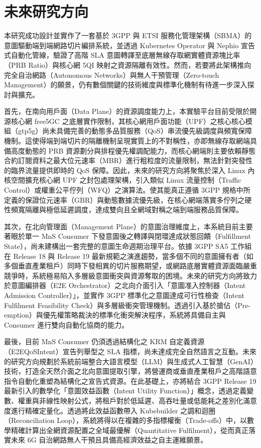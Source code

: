 \chapter{未來研究方向}
\label{sec:future_work}

本研究成功設計並實作了一套基於 3GPP 與 ETSI 服務化管理架構（SBMA）的意圖驅動端到端網路切片編排系統，並透過 Kubernetes Operator 與 Nephio 宣告式自動化管線，驗證了高階 SLA 意圖轉譯至底層無線存取網實體資源塊比率（PRB Ratio）與核心網 5QI 映射之資源隔離有效性。然而，若要將此架構推向完全自治網路（Autonomous Networks）與無人干預管理（Zero-touch Management）的願景，仍有數個關鍵的技術維度與標準化機制有待進一步深入探討與擴充。

首先，在南向用戶面（Data Plane）的資源調度能力上，本實驗平台目前受限於開源核心網 free5GC 之底層實作限制，其核心網用戶面功能（UPF）之核心核心模組（gtp5g）尚未具備完善的動態多品質服務（QoS）串流優先級調度與頻寬保障機制。這使得端到端切片的隔離機制呈現實質上的不對稱性，亦即無線存取網端具備高度動態的 PRB 資源劃分與排程優先權調配能力，而核心網端則主要依賴靜態合約訂閱資料之最大位元速率（MBR）進行粗粒度的流量限制，無法針對突發性的臨界流量提供即時的 QoS 保障。因此，未來的研究方向將聚焦於深入 Linux 內核空間擴充核心網 UPF 之封包處理架構，引入類似 Linux 流量控制（Traffic Control）或權重公平佇列（WFQ）之演算法。使其能真正遵循 3GPP 規格中所定義的保證位元速率（GBR）與動態數據流優先級，在核心網端落實多佇列之硬性頻寬隔離與極低延遲調度，達成雙向且全網域對稱之端到端服務品質保障。

其次，在北向管理面（Management Plane）的意圖治理維度上，本系統目前主要著眼於單一 MnS Consumer 下發意圖後之轉譯與閉環達成狀態回饋（Fulfillment State），尚未建構出一套完整的意圖生命週期治理平台。依據 3GPP SA5 工作組在 Release 18 與 Release 19 最新規範之演進趨勢，當多個不同的意圖擁有者（如多個垂直產業租戶）同時下發相異的切片服務期望，或網路底層實體資源面臨嚴重競爭時，系統極易陷入多層級意圖衝突與資源奪取的困境。未來的研究方向將致力於意圖編排器（E2E Orchestrator）之北向介面引入「意圖准入控制器（Intent Admission Controller）」，並實作 3GPP 標準化之意圖達成可行性檢查（Intent Fulfilment Feasibility Check）與多層級衝突管理機制。透過引入基於搶佔（Pre-emption）與優先權策略裁決的標準化衝突解決程序，系統將具備自主與 Consumer 進行雙向自動化協商的能力。

最後，目前 MnS Consumer 仍須透過結構化之 KRM 自定義資源（E2EQoSIntent）宣告列舉型之 SLA 指標，尚未達成完全自然語言之互動。未來的研究方向規劃於系統前端整合大語言模型（LLM）與生成式人工智慧（GenAI）技術，打造全天然介面之北向意圖提取引擎，將營運商或垂直產業租戶之高階語意指令自動化重塑為結構化之宣告式資源。在此基礎上，亦將結合 3GPP Release 19 最新引入的數學化「意圖效益函數（Intent Utility Function）」概念，透過定義變數、權重與非線性映射公式，將租戶對於低延遲、高吞吐量或低能耗之差別化滿意度進行精確定量化。透過將此效益函數帶入 Kubebuilder 之調和迴圈（Reconciliation Loop），系統將得以在複雜的多指標權衡（Trade-offs）中，以數學精確計算出全網資源配置之全域最優解（Quantitative Fulfilment），從而真正落實未來 6G 自治網路無人干預且具備高經濟效益之自主運維願景。